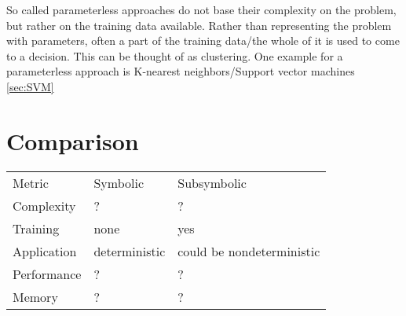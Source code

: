 So called parameterless approaches do not base their complexity on the problem, but rather on the training data available. Rather than representing the problem with parameters, often a part of the training data/the whole of it is used to come to a decision. This can be thought of as clustering.
One example for a parameterless approach is K-nearest neighbors/Support vector machines \autoref{sec:SVM}

\section{Comparison}
\begin{tabular}{l p{5cm} p{5cm}}
    Metric      & Symbolic  & Subsymbolic\\
    Complexity  & ? & ? \\
    Training    & none & yes \\
    Application & deterministic&could be nondeterministic\\
    Performance & ? & ? \\
    Memory      & ? & ? \\
\end{tabular}






